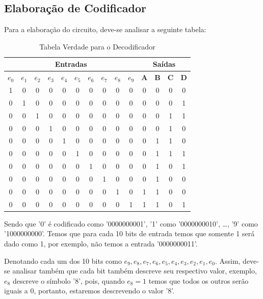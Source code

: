 \documentclass[12pt]{article}
\begin{document}
\subsection{Elaboração de Codificador}\label{sec:2.1}

Para a elaboração do circuito, deve-se analisar a seguinte tabela:
\begin{table}[H]
    \centering
    \caption{Tabela Verdade para o Decodificador}
    \begin{tabular}{|c|c|c|c|c|c|c|c|c|c||c|c|c|c|}\hline
    \multicolumn{10}{|c||}{Entradas} & \multicolumn{4}{|c|}{Saídas} \\\hline
    \textbf{$e_{0}$} & \textbf{$e_{1}$} & \textbf{$e_{2}$} & \textbf{$e_{3}$} & \textbf{$e_{4}$} & \textbf{$e_{5}$} & \textbf{$e_{6}$} & \textbf{$e_{7}$} & \textbf{$e_{8}$} & \textbf{$e_{9}$} & \textbf{A} & \textbf{B} & \textbf{C} & \textbf{D} \\\hline
    1 & 0 & 0 & 0 & 0 & 0 & 0 & 0 & 0 & 0 & 0 & 0 & 0 & 0\\\hline
    0 & 1 & 0 & 0 & 0 & 0 & 0 & 0 & 0 & 0 & 0 & 0 & 0 & 1\\\hline
    0 & 0 & 1 & 0 & 0 & 0 & 0 & 0 & 0 & 0 & 0 & 0 & 1 & 1 \\\hline
    0 & 0 & 0 & 1 & 0 & 0 & 0 & 0 & 0 & 0 & 0 & 0 & 1 & 0\\\hline
    0 & 0 & 0 & 0 & 1 & 0 & 0 & 0 & 0 & 0 & 0 & 1 & 1 & 0\\\hline
    0 & 0 & 0 & 0 & 0 & 1 & 0 & 0 & 0 & 0 & 0 & 1 & 1 & 1\\\hline
    0 & 0 & 0 & 0 & 0 & 0 & 1 & 0 & 0 & 0 & 0 & 1 & 0 & 1\\\hline
    0 & 0 & 0 & 0 & 0 & 0 & 0 & 1 & 0 & 0 & 0 & 1 & 0 & 0\\\hline
    0 & 0 & 0 & 0 & 0 & 0 & 0 & 0 & 1 & 0 & 1 & 1 & 0 & 0\\\hline
    0 & 0 & 0 & 0 & 0 & 0 & 0 & 0 & 0 & 1 & 1 & 1 & 0 & 1\\\hline
    \end{tabular}\label{tab:tabela_and}
\end{table}

Sendo que '0' é codificado como '0000000001', '1' como '0000000010', \ldots,
'9' como '1000000000'. Temos que para cada 10 bits de entrada temos que somente
1 será dado como 1, por exemplo, não temos a entrada '0000000011'.

Denotando cada um dos 10 bits como
$e_{9},e_{8},e_{7},e_{6},e_{5},e_{4},e_{3},e_{2},e_{1},e_{0}$. Assim, deve-se
analisar também que cada bit também descreve seu respectivo valor, exemplo,
$e_{8}$ descreve o símbolo '8', pois, quando $e_{8}=1$ temos que todos os outros
serão iguais a 0, portanto, estaremos descrevendo o valor '8'.
\end{document}
